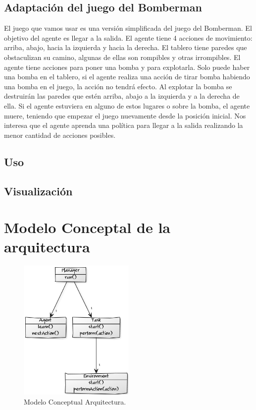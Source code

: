 \documentclass[a4paper,spanish] {article}
\begin{document}
	\subsection{Adaptaci\'on del juego del Bomberman}
	El juego que vamos usar es una versi\'on simplificada del juego del Bomberman. El objetivo del agente es llegar a la salida. El agente tiene 4 acciones de movimiento: arriba, abajo, hacia la izquierda y hacia la derecha. El tablero tiene paredes que obstaculizan su camino, algunas de ellas son rompibles y otras irrompibles. El agente tiene acciones para poner una bomba y para explotarla. Solo puede haber una bomba en el tablero, si el agente realiza una acci\'on de tirar bomba habiendo una bomba en el juego, la acci\'on no tendr\'a efecto. Al explotar la bomba se destruir\'an las paredes que est\'en arriba, abajo a la izquierda y a la derecha de ella. Si el agente estuviera en alguno de estos lugares o sobre la bomba, el agente muere, teniendo que empezar el juego nuevamente desde la posici\'on inicial. Nos interesa que el agente aprenda una pol\'itica para llegar a la salida realizando la menor cantidad de acciones posibles.	
	
	\subsection{Uso}
	\subsection{Visualizaci\'on}
	
\section{Modelo Conceptal de la arquitectura}
	
	\begin{figure}[h!]
  \centering
    \includegraphics[width=0.5\textwidth]{MCarquitectra.png}
  \caption{Modelo Conceptual Arquitectura.}

	\end{figure}
\end{document}
